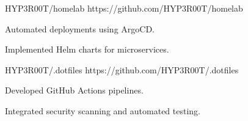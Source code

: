 {HYP3R00T/homelab}
{https://github.com/HYP3R00T/homelab}
{
\item Automated deployments using ArgoCD.
\item Implemented Helm charts for microservices.
}

{HYP3R00T/.dotfiles}
{https://github.com/HYP3R00T/.dotfiles}
{
\item Developed GitHub Actions pipelines.
\item Integrated security scanning and automated testing.
}
